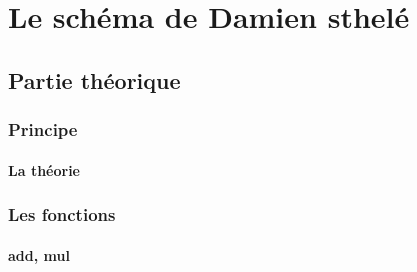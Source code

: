 \section{Le schéma de Damien sthelé}

\subsection{Partie théorique}

\begin{frame}
\frametitle{Principe}
\framesubtitle{La théorie}
\end{frame}


\begin{frame}
\frametitle{Les fonctions}
\framesubtitle{add, mul}
\end{frame}